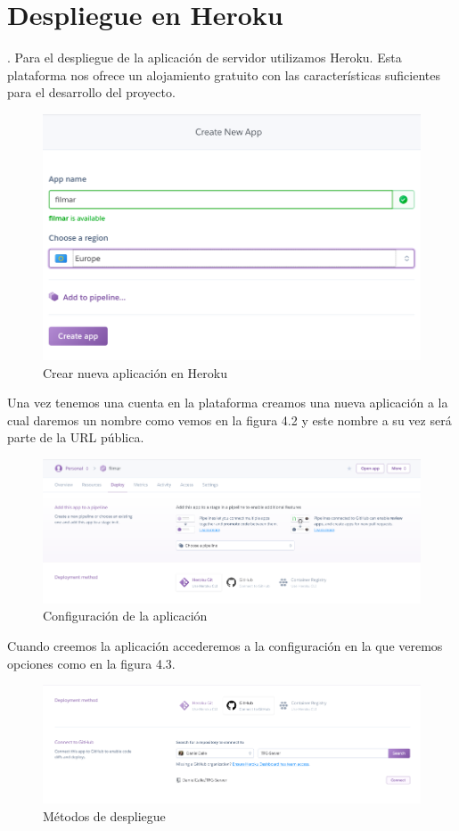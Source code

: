 \section{Despliegue en Heroku}. 
\label{makereference4.2}
Para el despliegue de la aplicación de servidor utilizamos Heroku. Esta plataforma nos ofrece un alojamiento gratuito con las características suficientes para el desarrollo del proyecto.
\begin{figure}[H]
    \centering
    \includegraphics[width=6in]{figures/chapter-4/heroku_1.png}
    \caption{Crear nueva aplicación en Heroku}
\end{figure}
Una vez tenemos una cuenta en la plataforma creamos una nueva aplicación a la cual daremos un nombre como vemos en la figura 4.2 y este nombre a su vez será parte de la URL pública.
\begin{figure}[H]
    \centering
    \includegraphics[width=6in]{figures/chapter-4/heroku_2.png}
    \caption{Configuración de la aplicación}
\end{figure}
Cuando creemos la aplicación accederemos a la configuración en la que veremos opciones como en la figura 4.3.
\begin{figure}[H]
    \centering
    \includegraphics[width=6in]{figures/chapter-4/heroku_3.png}
    \caption{Métodos de despliegue}
\end{figure}
